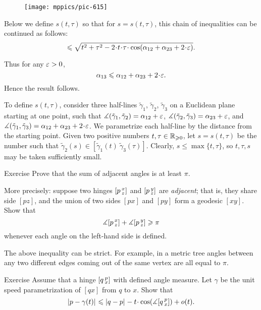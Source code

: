 \begin{wrapfigure}{o}{30 mm}
\vskip-6mm
\centering
\texttt{[image: mppics/pic-615]}
\vskip3mm
\end{wrapfigure}

Below we define 
$s(t,\tau)$ so that for 
$s=s(t,\tau)$, this chain of inequalities can be continued as follows:
\[\le
\sqrt{t^2+\tau^2-2\cdot t\cdot \tau\cdot \cos(\alpha_{12}+\alpha_{23}+2\cdot \eps)}.
\]

Thus for any $\varepsilon>0$, 
\[\alpha_{13}\le \alpha_{12}+\alpha_{23}+2\cdot \eps.\]
Hence the result follows.

To define $s(t,\tau)$, consider three half-lines $\tilde \gamma_1$, $\tilde \gamma_2$, $\tilde \gamma_3$ on a Euclidean plane starting at one point, such that
$\mangle(\tilde \gamma_1,\tilde \gamma_2)\z=\alpha_{12}+\eps$,
$\mangle(\tilde \gamma_2,\tilde \gamma_3)\z=\alpha_{23}+\eps$,
and $\mangle(\tilde \gamma_1,\tilde \gamma_3)\z=\alpha_{12}\z+\alpha_{23}\z+2\cdot \eps$.
We parametrize each half-line by the distance from the starting point.
Given two positive numbers $t,\tau\in\mathbb{R}_{\geqslant0}$, let $s=s(t,\tau)$ be 
the number such that 
$\tilde \gamma_2(s)\in[\tilde \gamma_1(t)\ \tilde \gamma_3(\tau)]$. 
Clearly, $s\le\max\{t,\tau\}$, so $t,\tau,s$ may be taken sufficiently small.
\qeds 

\begin{thm}{Exercise}\label{ex:adjacent-angles}
Prove that the sum of adjacent angles is at least $\pi$.

More precisely: suppose two hinges $[p\,{}^{x}_{z}]$ and $[p\,{}^{y}_{z}]$ are \emph{adjacent};
that is, they share side $[pz]$, and the union of two sides $[px]$ and $[py]$ form a geodesic $[xy]$.
Show that
\[\measuredangle[p\,{}^{x}_{z}]+\measuredangle[p\,{}^{y}_{z}]\geqslant \pi\]
whenever  each angle on the left-hand side is defined.
\end{thm}

The above inequality can be strict.
For example, in a metric tree angles between any two different edges coming out of the same vertex are all equal to $\pi$.

\begin{thm}{Exercise}\label{ex:first-var}
Assume that a hinge $[q\,{}^{p}_{x}]$ with defined angle measure.
Let $\gamma$ be the unit speed parametrization of $[qx]$ from $q$ to $x$.
Show that
\[\dist{p}{\gamma(t)}{}
\le
\dist{q}{p}{}-t\cdot \cos(\mangle\hinge q p x)+o(t).\]

\end{thm}

